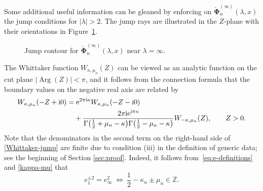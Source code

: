 \documentclass[pdftex]{sigma}
\numberwithin{equation}{section}
\newcommand{\ee}{\mathrm{e}}
\newcommand{\ii}{\mathrm{i}}
\newcommand{\para}[1]{\breve{#1}}
\newcommand{\R}{{\mathbb{R}}}
\newcommand{\Z}{{\mathbb{Z}}}
\newcommand{\im}{\operatorname{Im}}
\renewcommand{\arg}{\operatorname{Arg}}
\begin{document}
Some additional useful information can be gleaned by enforcing on
$\para{\boldsymbol{\Phi}}_n^{(\infty)}(\lambda,x)$ the jump conditions for $|\lambda|>2$. The jump rays are illustrated in the $Z$-plane with their orientations in Figure~\ref{fig1}.
\begin{figure}
 \centering
 \caption{Jump contour for $\para{\boldsymbol{\Phi}}_n^{(\infty)}(\lambda,x)$ near $\lambda=\infty$.}
\label{fig1}
\end{figure}
The Whittaker function $W_{\kappa,\mu_n}(Z)$ can be viewed as an analytic function on the cut plane $|{\arg}(Z)|<\pi$, and it follows from the connection formula \cite[equation~(13.14.13)]{DLMF} that the boundary values on the negative real axis are related by
\begin{align}
&W_{\kappa,\mu_n}(-Z+\ii 0)= \ee^{2\pi \ii\kappa}W_{\kappa,\mu_n}(-Z-\ii 0)\nonumber \\
&\hphantom{W_{\kappa,\mu_n}(-Z+\ii 0)=}{} +
 \frac{2\pi \ii\ee^{\ii\pi\kappa}}{\Gamma\big(\frac{1}{2}+\mu_n-\kappa\big)\Gamma\big(\frac{1}{2}-\mu_n-\kappa\big)}W_{-\kappa,\mu_n}(Z),\qquad Z>0.
\label{Whittaker-jump}
\end{align}
Note that the denominators in the second term on the right-hand side of \eqref{Whittaker-jump} are finite due to condition (iii) in the definition of generic data; see the beginning of Section \ref{sec:proof}. Indeed, it follows from~\eqref{eq:e-definitions} and \eqref{kappa-mu} that
\[
e_1^{\pm 2} = e_\infty^2 \ \Leftrightarrow \ \frac{1}{2} - \kappa_n \pm \mu_n \in \Z.
\]
\end{document}
